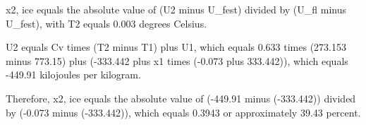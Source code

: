 x2, ice equals the absolute value of (U2 minus U_fest) divided by (U_fl minus U_fest), with T2 equals 0.003 degrees Celsius.  

U2 equals Cv times (T2 minus T1) plus U1, which equals 0.633 times (273.153 minus 773.15) plus (-333.442 plus x1 times (-0.073 plus 333.442)), which equals -449.91 kilojoules per kilogram.  

Therefore, x2, ice equals the absolute value of (-449.91 minus (-333.442)) divided by (-0.073 minus (-333.442)), which equals 0.3943 or approximately 39.43 percent.